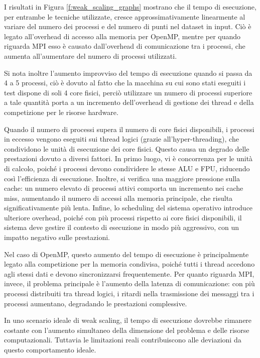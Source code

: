 \documentclass[letterpaper,11pt,leqno]{article}
\begin{document}
I risultati in Figura \ref{f:weak_scaling_graphs} mostrano che il tempo di esecuzione, per entrambe le tecniche utilizzate, cresce approssimativamente linearmente al variare del numero dei processi e del numero di punti nel dataset in input. Ciò è legato all'overhead di accesso alla memoria per OpenMP, mentre per quando riguarda MPI esso è causato dall'overhead di comunicazione tra i processi, che aumenta all'aumentare del numero di processi utilizzati.

Si nota inoltre l'aumento improvviso del tempo di esecuzione quando si passa da 4 a 5 processi, ciò è dovuto al fatto che la macchina su cui sono stati eseguiti i test dispone di soli 4 core fisici, perciò utilizzare un numero di processi superiore a tale quantità porta a un incremento dell’overhead di gestione dei thread e della competizione per le risorse hardware.  

Quando il numero di processi supera il numero di core fisici disponibili, i processi in eccesso vengono eseguiti sui thread logici (grazie all’hyper-threading), che condividono le unità di esecuzione dei core fisici. Questo causa un degrado delle prestazioni dovuto a diversi fattori. In primo luogo, vi è concorrenza per le unità di calcolo, poiché i processi devono condividere le stesse ALU e FPU, riducendo così l'efficienza di esecuzione. Inoltre, si verifica una maggiore pressione sulla cache: un numero elevato di processi attivi comporta un incremento nei cache miss, aumentando il numero di accessi alla memoria principale, che risulta significativamente più lenta. Infine, lo scheduling del sistema operativo introduce ulteriore overhead, poiché con più processi rispetto ai core fisici disponibili, il sistema deve gestire il contesto di esecuzione in modo più aggressivo, con un impatto negativo sulle prestazioni.  

Nel caso di OpenMP, questo aumento del tempo di esecuzione è principalmente legato alla competizione per la memoria condivisa, poiché tutti i thread accedono agli stessi dati e devono sincronizzarsi frequentemente. Per quanto riguarda MPI, invece, il problema principale è l’aumento della latenza di comunicazione: con più processi distribuiti tra thread logici, i ritardi nella trasmissione dei messaggi tra i processi aumentano, degradando le prestazioni complessive.

In uno scenario ideale di weak scaling, il tempo di esecuzione dovrebbe rimanere costante con l'aumento simultaneo della dimensione del problema e delle risorse computazionali. Tuttavia le limitazioni reali contribuiscono alle deviazioni da questo comportamento ideale.
\end{document}
